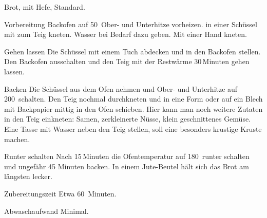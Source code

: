 \begin{recipe}{Brot, mit Hefe, Standard.}
	\item[Vorbereitung] Backofen auf 50\textcelsius~Ober- und Unterhitze vorheizen.
	 in einer Schüssel mit
	 zum Teig kneten. 
	\hint Wasser bei Bedarf dazu geben. 
	\hint Mit einer Hand kneten.
	\item[Gehen lassen] Die Schüssel mit einem Tuch abdecken und in den Backofen stellen. Den Backofen ausschalten und den Teig mit der Restwärme 30\,Minuten gehen lassen.
	\item[Backen] Die Schüssel aus dem Ofen nehmen und Ober- und Unterhitze auf 200\textcelsius~schalten. Den Teig nochmal durchkneten und in eine Form oder auf ein Blech mit Backpapier mittig in den Ofen schieben. 
	\hint Hier kann man noch weitere Zutaten in den Teig einkneten: Samen, zerkleinerte Nüsse, klein geschnittenes Gemüse.
	\hint Eine Tasse mit Wasser neben den Teig stellen, soll eine besonders krustige Kruste machen.
	\item[Runter schalten] Nach 15\,Minuten die Ofentemperatur auf 180\textcelsius~runter schalten und ungefähr 45 Minuten backen.
	\hint In einem Jute-Beutel hält sich das Brot am längsten lecker.
	\item[Zubereitungszeit] Etwa 60~Minuten.
	\item[Abwaschaufwand] Minimal.
\end{recipe}
